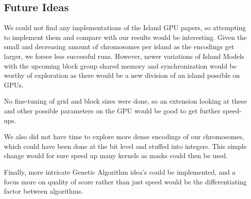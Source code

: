 \documentclass[11pt]{article}       %
\begin{document}
\subsection{Future Ideas}
We could not find any implementations of the Island GPU papers, so attempting to implement them and compare with our results would be interesting. Given the small and decreasing amount of chromosomes per island as the encodings get larger, we forsee less successful runs. However, newer variations of Island Models with the upcoming block group shared memory and synchronization would be worthy of exploration as there would be a new division of an island possible on GPUs.

No fine-tuning of grid and block sizes were done, so an extension looking at these and other possible parameters on the GPU would be good to get further speed-ups.

We also did not have time to explore more dense encodings of our chromosomes, which could have been done at the bit level and stuffed into integers. This simple change would for sure speed up many kernels as masks could then be used.

Finally, more intricate Genetic Algorithm idea's could be implemented, and a focus more on quality of score rather than just speed would be the differentiating factor between algorithms.





\end{document}
